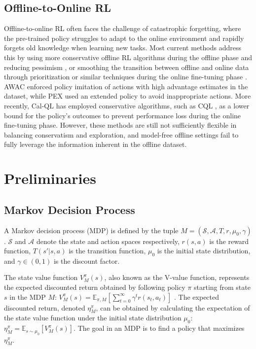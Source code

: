 \documentclass[conference]{IEEEtran}
\begin{document}
\subsection{Offline-to-Online RL}
Offline-to-online RL often faces the challenge of catastrophic forgetting, where the pre-trained policy struggles to adapt to the online environment and rapidly forgets old knowledge when learning new tasks. Most current methods address this by using more conservative offline RL algorithms during the offline phase and reducing pessimism \cite{e2o}, or smoothing the transition between offline and online data through prioritization or similar techniques during the online fine-tuning phase \cite{balancedreplay}. AWAC \cite{awac} enforced policy imitation of actions with high advantage estimates in the dataset, while PEX \cite{pex} used an extended policy to avoid inappropriate actions. More recently, Cal-QL \cite{calql} has employed conservative algorithms, such as CQL \cite{cql}, as a lower bound for the policy's outcomes to prevent performance loss during the online fine-tuning phase. However, these methods are still not sufficiently flexible in balancing conservatism and exploration, and model-free offline settings fail to fully leverage the information inherent in the offline dataset.

\section{Preliminaries}

\subsection{Markov Decision Process}

A Markov decision process (MDP) is defined by the tuple \( M = (\mathcal{S}, \mathcal{A}, T, r, \mu_0, \gamma) \). \( \mathcal{S} \) and \( \mathcal{A} \) denote the state and action spaces respectively, \( r(s, a) \) is the reward function, \( T(s'|s, a) \) is the transition function, \( \mu_0 \) is the initial state distribution, and \( \gamma \in (0, 1) \) is the discount factor. %

The state value function \( V_M^\pi(s) \), also known as the V-value function, represents the expected discounted return obtained by following policy \( \pi \) starting from state \( s \) in the MDP \( M \):
\(
V_M^\pi(s) = \mathbb{E}_{\pi, M}\left[\sum_{t=0}^\infty \gamma^t r(s_t, a_t)\right]
\) .
The expected discounted return, denoted \( \eta_M^\pi \), can be obtained by calculating the expectation of the state value function under the initial state distribution \( \mu_0 \):
\(
\eta_M^\pi = \mathbb{E}_{s \sim \mu_0}[V_M^\pi(s)]
\).
The goal in an MDP is to find a policy that maximizes \( \eta_M^\pi \).
\end{document}
